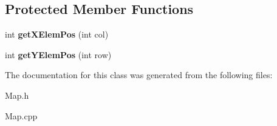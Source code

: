 \subsection*{Protected Member Functions}
\begin{DoxyCompactItemize}
\item 
\mbox{\label{class_map_a46c8ba4683ce97e3f5120be02b0ace94}} 
int {\bfseries get\+X\+Elem\+Pos} (int col)
\item 
\mbox{\label{class_map_a8efab6f1e807cb4cb576fc5dcfed3075}} 
int {\bfseries get\+Y\+Elem\+Pos} (int row)
\end{DoxyCompactItemize}


The documentation for this class was generated from the following files\+:\begin{DoxyCompactItemize}
\item 
Map.\+h\item 
Map.\+cpp\end{DoxyCompactItemize}

